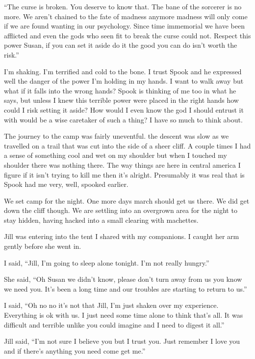 ``The curse is broken. You deserve to know that. The bane of the sorcerer is no more. We aren't chained to the fate of madness anymore madness will only come if we are found wanting in our psychology. Since time immemorial we have been afflicted and even the gods who seen fit to break the curse could not. Respect this power Susan, if you can set it aside do it the good you can do isn't worth the risk.''

I'm shaking. I'm terrified and cold to the bone. I trust Spook and he expressed well the danger of the power I'm holding in my hands. I want to walk away but what if it falls into the wrong hands? Spook is thinking of me too in what he says, but unless I knew this terrible power were placed in the right hands how could I risk setting it aside? How would I even know the god I should entrust it with would be a wise caretaker of such a thing? I have so much to think about.

The journey to the camp was fairly uneventful. the descent was slow as we travelled on a trail that was cut into the side of a sheer cliff. A couple times I had a sense of something cool and wet on my shoulder but when I touched my shoulder there was nothing there. The way things are here in central america I figure if it isn't trying to kill me then it's alright. Presumably it was real that is Spook had me very, well, spooked earlier.

We set camp for the night. One more days march should get us there. We did get down the cliff though. We are settling into an overgrown area for the night to stay hidden, having hacked into a small clearing with machettes.

Jill was entering into the tent I shared with my companions. I caught her arm gently before she went in.

I said, ``Jill, I'm going to sleep alone tonight. I'm not really hungry.''

She said, ``Oh Susan we didn't know, please don't turn away from us you know we need you. It's been a long time and our troubles are starting to return to us.''

I said, ``Oh no no it's not that Jill, I'm just shaken over my experience. Everything is ok with us. I just need some time alone to think that's all. It was difficult and terrible unlike you could imagine and I need to digest it all.''

Jill said, ``I'm not sure I believe you but I trust you. Just remember I love you and if there's anything you need come get me.''

